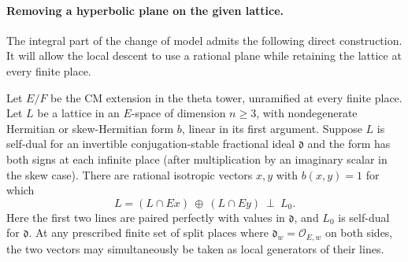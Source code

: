\paragraph{Removing a hyperbolic plane on the given lattice.}
The integral part of the change of model admits the following direct
construction. It will allow the local descent to use a rational plane
while retaining the lattice at every finite place.

\begin{proposition}\label{famtheta:plane}
Let \(E/F\) be the CM extension in the theta tower, unramified at
every finite place. Let \(L\) be a lattice in an \(E\)-space of
dimension \(n\ge3\), with nondegenerate Hermitian or skew-Hermitian
form \(b\), linear in its first argument. Suppose \(L\) is self-dual
for an invertible conjugation-stable fractional ideal \(\mathfrak d\)
and the form has both signs at each infinite place (after multiplication
by an imaginary scalar in the skew case). There are rational isotropic
vectors \(x,y\) with \(b(x,y)=1\) for which
\[
 L=(L\cap Ex)\ \oplus\ (L\cap Ey)\ \perp\ L_0 .
\]
Here the first two lines are paired perfectly with values in
\(\mathfrak d\), and \(L_0\) is self-dual for \(\mathfrak d\).
At any prescribed finite set of split places where
\(\mathfrak d_w=\mathcal O_{E,w}\) on both sides, the two vectors
may simultaneously be taken as local generators of their lines.
\end{proposition}
